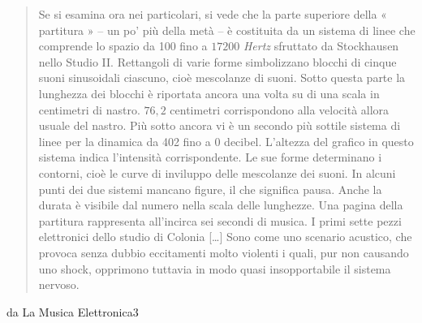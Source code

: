 \begin{quote}
	Se si esamina ora nei particolari, si vede che la parte superiore della « partitura » – un po’ più della metà – è costituita da un sistema di linee che comprende lo spazio da 100 fino a $ 17200 $ \emph{Hertz} sfruttato da Stockhausen nello Studio II. Rettangoli di varie forme simbolizzano blocchi di cinque suoni sinusoidali ciascuno, cioè mescolanze di suoni. Sotto questa parte la lunghezza dei blocchi è riportata ancora una volta su di una scala in centimetri di nastro. $ 76,2 $ centimetri corrispondono alla velocità allora usuale del nastro. Più sotto ancora vi è un secondo più sottile sistema di linee per la dinamica da 402 fino a 0 decibel. L’altezza del grafico in questo sistema indica l’intensità corrispondente. Le sue forme determinano i contorni, cioè le curve di inviluppo delle mescolanze dei suoni. In alcuni punti dei due sistemi mancano figure, il che significa pausa. Anche la durata è visibile dal numero nella scala delle lunghezze. Una pagina della partitura rappresenta all’incirca sei secondi di musica.
	I primi sette pezzi elettronici dello studio di Colonia [\ldots] Sono come uno scenario acustico, che provoca senza dubbio eccitamenti molto violenti i quali, pur non causando uno shock, opprimono tuttavia in modo quasi insopportabile il sistema nervoso.
\end{quote}

da La Musica Elettronica3

